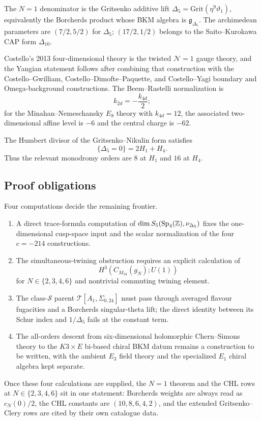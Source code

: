 The $N=1$ denominator is the Gritsenko additive lift
$\Delta_5=\mathrm{Grit}(\eta^9\vartheta_1)$, equivalently the
Borcherds product whose BKM algebra is
$\mathfrak g_{\Delta_5}$.  The archimedean parameters are
$(7/2,5/2)$ for $\Delta_5$; $(17/2,1/2)$ belongs to the
Saito--Kurokawa CAP form $\Delta_{10}$.

Costello's 2013 four-dimensional theory is the twisted
$\mathcal N=1$ gauge theory, and the Yangian statement follows after
combining that construction with the Costello--Gwilliam,
Costello--Dimofte--Paquette, and Costello--Yagi boundary and
Omega-background constructions.  The Beem--Rastelli normalization is
\[
  k_{2d}=-\frac{k_{4d}}{2};
\]
for the Minahan--Nemeschansky $E_8$ theory with $k_{4d}=12$, the
associated two-dimensional affine level is $-6$ and the central charge
is $-62$.

The Humbert divisor of the Gritsenko--Nikulin form satisfies
\[
  \{\Delta_5=0\}=2H_1+H_4.
\]
Thus the relevant monodromy orders are $8$ at $H_1$ and $16$ at $H_4$.

\subsection{Proof obligations}
\label{wn:subsec:k3e-proof-obligations}

Four computations decide the remaining frontier.
\begin{enumerate}
  \item A direct trace-formula computation of
  $\dim S_5(\mathrm{Sp}_4(\mathbb{Z}),\nu_{\Delta_5})$ fixes the one-dimensional
  cusp-space input and the scalar normalization of the four
  $c=-214$ constructions.
  \item The simultaneous-twining obstruction requires an explicit
  calculation of
  \[
    H^3(C_{M_{24}}(g_N);U(1))
  \]
  for $N\in\{2,3,4,6\}$ and nontrivial commuting twining element.
  \item The class-$\mathcal S$ parent
  $\mathcal T[A_1,\Sigma_{0,24}]$ must pass through averaged flavour
  fugacities and a Borcherds singular-theta lift; the direct identity
  between its Schur index and $1/\Delta_5$ fails at the constant term.
  \item The all-orders descent from six-dimensional holomorphic
  Chern--Simons theory to the $K3\times E$ bi-based chiral BKM datum
  remains a construction to be written, with the ambient $E_3$ field
  theory and the specialized $E_1$ chiral algebra kept separate.
\end{enumerate}

Once these four calculations are supplied, the $N=1$ theorem and the
CHL rows at $N\in\{2,3,4,6\}$ sit in one statement: Borcherds weights
are always read as $c_N(0)/2$, the CHL constants are
$(10,8,6,4,2)$, and the extended Gritsenko--Clery rows are cited by
their own catalogue data.
